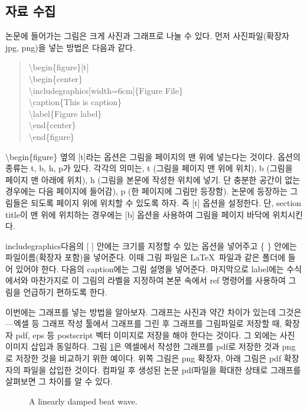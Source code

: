 \documentclass{gshs-report-v1.2}
\begin{document}
\subsection{자료 수집}
논문에 들어가는 그림은 크게 사진과 그래프로 나눌 수 있다. 먼저 사진파일(확장자 jpg, png)을 넣는 방법은 다음과 같다.
\begin{quote}
	{\textbackslash}begin\{figure\}[t]\\
	{\textbackslash}begin\{center\}\\
	{\textbackslash}includegraphics[width=6cm]\{Figure File\}\\
	{\textbackslash}caption\{This is caption\}\\
	{\textbackslash}label\{Figure label\}\\
	{\textbackslash}end\{center\}\\
	{\textbackslash}end\{figure\}
\end{quote}
{\textbackslash}begin\{figure\} 옆의 [t]라는 옵션은 그림을 페이지의 맨 위에 넣는다는 것이다. 옵션의 종류는 t, b, h, p가 있다. 각각의 의미는, t (그림을 페이지 맨 위에 위치), b (그림을 페이지 맨 아래에 위치), h (그림을 본문에 작성한 위치에 넣기. 단 충분한 공간이 없는 경우에는 다음 페이지에 들어감), p (한 페이지에 그림만 등장함). 논문에 등장하는 그림들은 되도록 페이지 위에 위치할 수 있도록 하자. 즉 [t] 옵션을 설정한다. 단, section title이 맨 위에 위치하는 경우에는 [b] 옵션을 사용하여 그림을 페이지 바닥에 위치시킨다.

includegraphics다음의 [ ] 안에는 크기를 지정할 수 있는 옵션을 넣어주고 \{ \} 안에는 파일이름(확장자 포함)을 넣어준다. 이때 그림 파일은 \LaTeX\ 파일과 같은 폴더에 들어 있어야 한다. 다음의 caption에는 그림 설명을 넣어준다. 마지막으로 label에는 수식에서와 마찬가지로 이 그림의 라벨을 지정하여 본문 속에서 ref 명령어를 사용하여 그림을 언급하기 편하도록 한다.

이번에는 그래프를 넣는 방법을 알아보자. 그래프는 사진과 약간 차이가 있는데 그것은---엑셀 등 그래프 작성 툴에서 그래프를 그린 후 그래프를 그림파일로 저장할 때, 확장자 pdf, eps 등 postscript 벡터 이미지로 저장을 해야 한다는 것이다. 그 외에는 사진 이미지 삽입과 동일하다. 그림 \ref{Fig01}은 엑셀에서 작성한 그래프를 pdf로 저장한 것과 png로 저장한 것을 비교하기 위한 예이다. 위쪽 그림은 png 확장자, 아래 그림은 pdf 확장자의 파일을 삽입한 것이다. 컴파일 후 생성된 논문 pdf파일을 확대한 상태로 그래프를 살펴보면 그 차이를 알 수 있다.


\begin{figure}[t]
	\begin{center}
		\caption{A linearly damped beat wave.} \label{Fig01}
	\end{center}
\end{figure}
\end{document}
